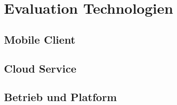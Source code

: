 \section{Evaluation Technologien}

\subsection{Mobile Client}
\subsection{Cloud Service}
\subsection{Betrieb und Platform}